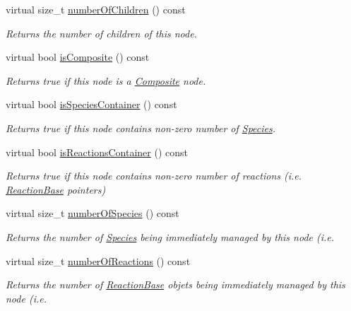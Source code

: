 \begin{DoxyCompactItemize}
virtual size\-\_\-t \hyperlink{classchem_1_1Component_a720ec4ef4aaadfec3e47c31451d28637}{number\-Of\-Children} () const 
\begin{DoxyCompactList}\small\item\em Returns the number of children of this node. \end{DoxyCompactList}\item 
virtual bool \hyperlink{classchem_1_1Component_af2c73f75f937d457a55c1e0120833cb8}{is\-Composite} () const 
\begin{DoxyCompactList}\small\item\em Returns true if this node is a \hyperlink{classchem_1_1Composite}{Composite} node. \end{DoxyCompactList}\item 
virtual bool \hyperlink{classchem_1_1Component_a3c0f652fe5b6910f07c046fe0190b7b5}{is\-Species\-Container} () const 
\begin{DoxyCompactList}\small\item\em Returns true if this node contains non-\/zero number of \hyperlink{classchem_1_1Species}{Species}. \end{DoxyCompactList}\item 
virtual bool \hyperlink{classchem_1_1Component_a8c79ee4335fadfcef56b14a62b742457}{is\-Reactions\-Container} () const 
\begin{DoxyCompactList}\small\item\em Returns true if this node contains non-\/zero number of reactions (i.\-e. \hyperlink{classchem_1_1ReactionBase}{Reaction\-Base} pointers) \end{DoxyCompactList}\item 
virtual size\-\_\-t \hyperlink{classchem_1_1Component_a41d313350ea214ae94d54cb0c6263a9c}{number\-Of\-Species} () const 
\begin{DoxyCompactList}\small\item\em Returns the number of \hyperlink{classchem_1_1Species}{Species} being immediately managed by this node (i.\-e. \end{DoxyCompactList}\item 
virtual size\-\_\-t \hyperlink{classchem_1_1Component_af76701fa683d7378915b5b6ad55bd357}{number\-Of\-Reactions} () const 
\begin{DoxyCompactList}\small\item\em Returns the number of \hyperlink{classchem_1_1ReactionBase}{Reaction\-Base} objets being immediately managed by this node (i.\-e. \end{DoxyCompactList}\item 

\end{DoxyCompactItemize}
